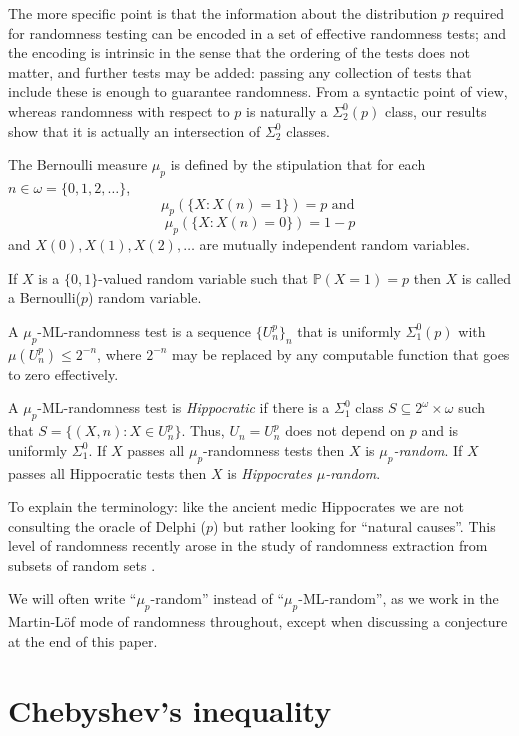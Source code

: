 The more specific point is that the information about the distribution $p$ required for randomness testing can be encoded in a set of effective randomness tests; and the encoding is intrinsic in the sense that the ordering of the tests does not matter, and further tests may be added: passing any collection of tests that include these is enough to guarantee randomness. From a syntactic point of view, whereas randomness with respect to $p$ is naturally a $\Sigma^0_2(p)$ class, our results show that it is actually an intersection of $\Sigma^0_{2}$ classes.

\begin{definition}
	\leanok
The Bernoulli measure $\mu_{p}$ is defined by the stipulation that for each $n\in\omega=\{0,1,2,\ldots\}$, 
\[
\mu_p(\{X: X(n)=1\})=p \text{ and }
\]
\[
\mu_p(\{X:X(n)=0\})=1-p
\]
and $X(0),X(1),X(2),\ldots$ are mutually independent random variables.
\end{definition}
If $X$ is a $\{0,1\}$-valued random variable such that $\mathbb P(X=1) = p$ then $X$ is called a Bernoulli($p$) random variable.
		

\begin{definition}
	A $\mu_p$-ML-randomness test is a sequence $\{U^p_n\}_n$ that is uniformly $\Sigma^0_1(p)$ with $\mu(U^p_n)\le 2^{-n}$, where $2^{-n}$ may be replaced by any computable function that goes to zero effectively. 
	 
	A $\mu_p$-ML-randomness test is \emph{Hippocratic} if there is a $\Sigma^0_1$ class $S\subseteq 2^\omega\times\omega$ such that $S=\{(X,n):X\in U_n^p\}$. Thus, $U_n=U_n^p$ does not depend on $p$ and is uniformly $\Sigma^0_1$.  
If $X$ passes all $\mu_p$-randomness tests then $X$ is \emph{$\mu_p$-random}. If $X$ passes all Hippocratic tests then $X$ is \emph{Hippocrates $\mu$-random}.
\end{definition}

To explain the terminology: like the ancient medic Hippocrates we are not consulting the oracle of Delphi ($p$) but rather looking for ``natural causes''. This level of randomness recently arose in the study of randomness extraction from subsets of random sets \cite{MRL}.

We will often write ``$\mu_p$-random'' instead of ``$\mu_p$-ML-random'', as we work in the Martin-L\"of mode of randomness throughout, except when discussing a conjecture at the end of this paper.



\section{Chebyshev's inequality}

